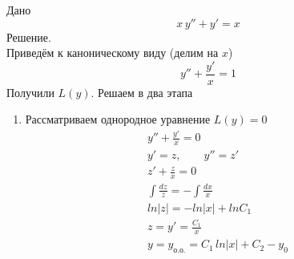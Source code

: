 \begin{Example}
    Дано
    \[
        x\,y'' + y' = x
    \]
    Решение.\\
    Приведём к каноническому виду (делим на $x$)
    \[
        y'' + \frac{y'}{x} = 1
    \]
    Получили $L(y)$. Решаем в два этапа
    \begin{enumerate}
        \item Рассматриваем однородное уравнение $L(y) = 0$
        \begin{gather*}
            y'' + \frac{y'}{x} = 0\\
            y' = z, \qquad y'' = z'\\
            z' + \frac{z}{x} = 0\\
            \int \frac{dz}{z} = - \int \frac{dx}{x}\\
            ln|z| = - ln|x| + lnC_1\\
            z = y' = \frac{C_1}{x}\\
            y = y_{\text{о.о.}} = C_1\, ln|x| + C_2 - y_0
        \end{gather*}
        

\end{enumerate}
\end{Example}

